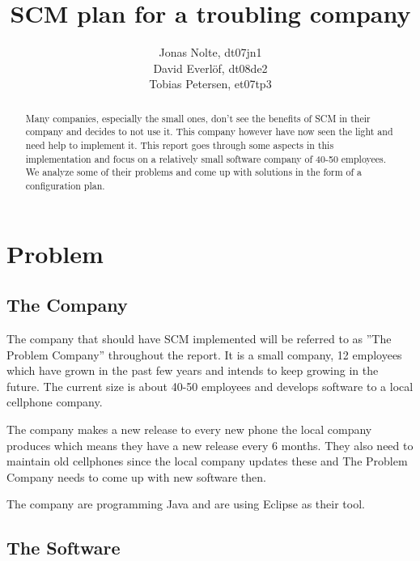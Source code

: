\documentclass[a4paper,10pt]{article}
\title{SCM plan for a troubling company}
\author{Jonas Nolte, dt07jn1\\
David Everlöf, dt08de2\\
Tobias Petersen, et07tp3}
\begin{document}
\maketitle

\begin{abstract}

Many companies, especially the small ones, don't see the benefits of SCM in their company and decides to not use it.
This company however have now seen the light and need help to implement it.
This report goes through some aspects in this implementation and focus on a relatively small software company of 40-50 employees.
We analyze some of their problems and come up with solutions in the form of a configuration plan.


\end{abstract}
\newpage

\tableofcontents
\newpage

\section{Problem}

\subsection{The Company}

The company that should have SCM implemented will be referred to as ''The Problem Company'' throughout the report.
It is a small company, 12 employees which have grown in the past few years and intends to keep growing in the future.
The current size is about 40-50 employees and develops software to a local cellphone company.

The company makes a new release to every new phone the local company produces which means they have a new release every 6 months.
They also need to maintain old cellphones since the local company updates these and The Problem Company needs to come up with new software then.

The company are programming Java and are using Eclipse as their tool.

\subsection{The Software}
\end{document}
